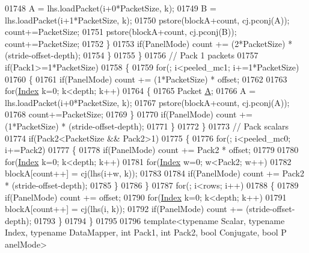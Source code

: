 \begin{DoxyCode}
01748         A = lhs.loadPacket(i+0*PacketSize, k);
01749         B = lhs.loadPacket(i+1*PacketSize, k);
01750         pstore(blockA+count, cj.pconj(A)); count+=PacketSize;
01751         pstore(blockA+count, cj.pconj(B)); count+=PacketSize;
01752       \}
01753       \textcolor{keywordflow}{if}(PanelMode) count += (2*PacketSize) * (stride-offset-depth);
01754     \}
01755   \}
01756   \textcolor{comment}{// Pack 1 packets}
01757   \textcolor{keywordflow}{if}(Pack1>=1*PacketSize)
01758   \{
01759     \textcolor{keywordflow}{for}(; i<peeled\_mc1; i+=1*PacketSize)
01760     \{
01761       \textcolor{keywordflow}{if}(PanelMode) count += (1*PacketSize) * offset;
01762 
01763       \textcolor{keywordflow}{for}(\hyperlink{namespace_eigen_a62e77e0933482dafde8fe197d9a2cfde}{Index} k=0; k<depth; k++)
01764       \{
01765         Packet \hyperlink{group___core___module_class_eigen_1_1_matrix}{A};
01766         A = lhs.loadPacket(i+0*PacketSize, k);
01767         pstore(blockA+count, cj.pconj(A));
01768         count+=PacketSize;
01769       \}
01770       \textcolor{keywordflow}{if}(PanelMode) count += (1*PacketSize) * (stride-offset-depth);
01771     \}
01772   \}
01773   \textcolor{comment}{// Pack scalars}
01774   \textcolor{keywordflow}{if}(Pack2<PacketSize && Pack2>1)
01775   \{
01776     \textcolor{keywordflow}{for}(; i<peeled\_mc0; i+=Pack2)
01777     \{
01778       \textcolor{keywordflow}{if}(PanelMode) count += Pack2 * offset;
01779 
01780       \textcolor{keywordflow}{for}(\hyperlink{namespace_eigen_a62e77e0933482dafde8fe197d9a2cfde}{Index} k=0; k<depth; k++)
01781         \textcolor{keywordflow}{for}(\hyperlink{namespace_eigen_a62e77e0933482dafde8fe197d9a2cfde}{Index} w=0; w<Pack2; w++)
01782           blockA[count++] = cj(lhs(i+w, k));
01783 
01784       \textcolor{keywordflow}{if}(PanelMode) count += Pack2 * (stride-offset-depth);
01785     \}
01786   \}
01787   \textcolor{keywordflow}{for}(; i<rows; i++)
01788   \{
01789     \textcolor{keywordflow}{if}(PanelMode) count += offset;
01790     \textcolor{keywordflow}{for}(\hyperlink{namespace_eigen_a62e77e0933482dafde8fe197d9a2cfde}{Index} k=0; k<depth; k++)
01791       blockA[count++] = cj(lhs(i, k));
01792     \textcolor{keywordflow}{if}(PanelMode) count += (stride-offset-depth);
01793   \}
01794 \}
01795 
01796 \textcolor{keyword}{template}<\textcolor{keyword}{typename} Scalar, \textcolor{keyword}{typename} Index, \textcolor{keyword}{typename} DataMapper, \textcolor{keywordtype}{int} Pack1, \textcolor{keywordtype}{int} Pack2, \textcolor{keywordtype}{bool} Conjugate, \textcolor{keywordtype}{bool} P
      anelMode>

\end{DoxyCode}
